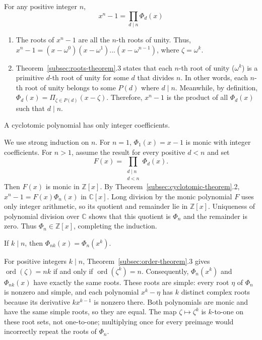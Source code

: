\begin{tcolorbox}[title={\textbf{\tboxtheorem{\ref*{subsec:cyclotomic-theorem}.2} Polynomial Decomposition into Cyclotomic Polynomials}}]
For any positive integer $n$, \[ x^n - 1 = \prod_{d \mid n} \Phi_d(x) \]
\end{tcolorbox}
\begin{myproof}
\begin{enumerate}
    \item The roots of $x^n - 1$ are all the $n$-th roots of unity. Thus, $x^n - 1 = (x - \omega^0)(x - \omega^1)...(x - \omega^{n-1})$, where $\zeta = \omega^k$.
    \item Theorem~\ref*{subsec:roots-theorem}.3 states that each $n$-th root of unity ($\omega^k$) is a primitive $d$-th root of unity for some $d$ that divides $n$. In other words, each $n$-th root of unity belongs to some $P(d)$ where $d \mid n$. Meanwhile, by definition, $\Phi_d(x) = \Pi_{\zeta \in P(d)} (x - \zeta)$. Therefore, $x^n - 1$ is the product of all $\Phi_d(x)$ such that $d \mid n$. 
\end{enumerate}
\end{myproof}
\begin{tcolorbox}[title={\textbf{\tboxtheorem{\ref*{subsec:cyclotomic-theorem}.3} Integer Coefficients of Cyclotomic Polynomials}}]
A cyclotomic polynomial has only integer coefficients.
\end{tcolorbox}
\begin{myproof}
We use strong induction on $n$. For $n=1$, $\Phi_1(x)=x-1$ is monic with integer coefficients. For $n>1$, assume the result for every positive $d<n$ and set
\[
F(x)=\prod_{\substack{d\mid n\\d<n}}\Phi_d(x).
\]
Then $F(x)$ is monic in $\mathbb{Z}[x]$. By Theorem~\ref*{subsec:cyclotomic-theorem}.2, $x^n-1=F(x)\Phi_n(x)$ in $\mathbb{C}[x]$. Long division by the monic polynomial $F$ uses only integer arithmetic, so its quotient and remainder lie in $\mathbb{Z}[x]$. Uniqueness of polynomial division over $\mathbb{C}$ shows that this quotient is $\Phi_n$ and the remainder is zero. Thus $\Phi_n\in\mathbb{Z}[x]$, completing the induction.
\end{myproof}
\begin{tcolorbox}[title={\textbf{\tboxtheorem{\ref*{subsec:cyclotomic-theorem}.4} Formula for $\bm{\Phi_{nk}(x)}$}}]
If $k \mid n$, then $\Phi_{nk}(x) = \Phi_n(x^k)$.
\end{tcolorbox}
\begin{myproof}
For positive integers $k\mid n$, Theorem~\ref*{subsec:order-theorem}.3 gives $\operatorname{ord}(\zeta)=nk$ if and only if $\operatorname{ord}(\zeta^k)=n$. Consequently, $\Phi_n(x^k)$ and $\Phi_{nk}(x)$ have exactly the same roots. These roots are simple: every root $\eta$ of $\Phi_n$ is nonzero and simple, and each polynomial $x^k-\eta$ has $k$ distinct complex roots because its derivative $kx^{k-1}$ is nonzero there. Both polynomials are monic and have the same simple roots, so they are equal. The map $\zeta\mapsto\zeta^k$ is $k$-to-one on these root sets, not one-to-one; multiplying once for every preimage would incorrectly repeat the roots of $\Phi_n$.
\end{myproof}